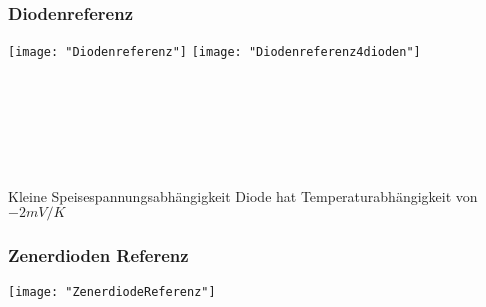 \subsubsection{Diodenreferenz}
\begin{minipage}[t]{0.3\textwidth}
	\vspace{0pt}								%
	\texttt{[image: "Diodenreferenz"]}
	\texttt{[image: "Diodenreferenz4dioden"]}
\end{minipage}\hspace{0.05\textwidth}
\begin{minipage}[t]{0.3\textwidth}
	\vspace{0pt}
	\\
	\\
	\\
	\\
	\\
\end{minipage}
\begin{minipage}[t]{0.3\textwidth}
	\vspace{0pt}
	Kleine Speisespannungsabhängigkeit
	Diode hat Temperaturabhängigkeit von $-2 mV/K$
	
\end{minipage}
\vspace{2mm}


\subsubsection{Zenerdioden Referenz}
\begin{minipage}[t]{0.3\textwidth}
	\vspace{0pt}								%
	\texttt{[image: "ZenerdiodeReferenz"]}
\end{minipage}\hspace{0.05\textwidth}
\begin{minipage}[t]{0.3\textwidth}
	\vspace{0pt}
\end{minipage}
\begin{minipage}[t]{0.3\textwidth}
	\vspace{0pt}
	
\end{minipage}
\vspace{2mm}


